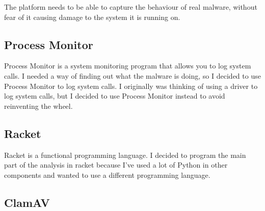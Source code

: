The platform needs to be able to capture the behaviour of real malware,
without fear of it causing damage to the system it is running on.

\subsection{Process Monitor}
Process Monitor is a system monitoring program that allows you to log system calls.
I needed a way of finding out what the malware is doing, so I decided to use Process Monitor to log system calls.
I originally was thinking of using a driver to log system calls, but I decided to use Process Monitor instead to avoid reinventing the wheel.

\subsection{Racket}
Racket is a functional programming language. I decided to program the main part of the analysis in racket because I've used a lot of Python in other components and wanted to use a different programming language.

\subsection{ClamAV}



